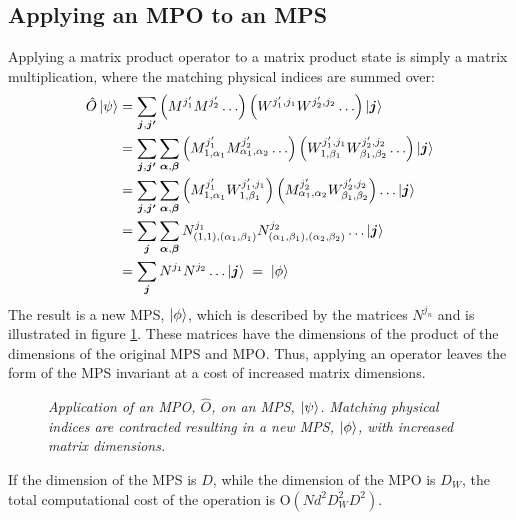 \subsection{Applying an MPO to an MPS}
Applying a matrix product operator to a matrix product state is simply a matrix multiplication, where the matching physical indices are summed over:
\begin{align}
	\hat{O} \ket{\psi} &= \sum_{\boldsymbol{j},\boldsymbol{j'}} \left( M^{ j_1 '} M^{j_2 ' } \ldots \right) \left( W^{j_1 ' , j_1} W^{j_2 ' , j_2} \ldots \right) \ket{\boldsymbol{j}} \nonumber \\
	&= \sum_{\boldsymbol{j},\boldsymbol{j'}} \sum_{\boldsymbol{\alpha},\boldsymbol{\beta}} \left( M_{1, \alpha_1}^{ j_1 '} M_{\alpha_1, \alpha_2}^{j_2 '} \ldots \right) \left( W_{1, \beta_1}^{j_1 ' , j_1 } W_{\beta_1, \beta_2}^{j_2 ', j_2 } \ldots \right) \ket{\boldsymbol{j}} \nonumber \\
&= \sum_{\boldsymbol{j},\boldsymbol{j'}} \sum_{\boldsymbol{\alpha},\boldsymbol{\beta}} \left( M_{1, \alpha_1}^{ j_1 '} W_{1, \beta_1}^{j_1 ' , j_1} \right) \left( M_{\alpha_1, \alpha_2}^{j_2 '}  W_{\beta_1, \beta_2}^{j_2 ' , j_2} \right) \ldots \ket{\boldsymbol{j}} \nonumber \\
&= \sum_{\boldsymbol{j}} \sum_{\boldsymbol{\alpha},\boldsymbol{\beta}} N_{(1,1),(\alpha_1 , \beta_1)}^{j_1} N_{(\alpha_1 , \beta_1),(\alpha_2 , \beta_2)}^{j_2} \ldots \ket{\boldsymbol{j}} \nonumber \\
&= \sum_{\boldsymbol{j}} N^{j_1} N^{j_2} \ldots \ket{\boldsymbol{j}} \; = \; \ket{\phi}
\label{eq:optBracketsMPO}
\end{align} 
The result is a new MPS, $\ket{\phi}$, which is described by the matrices $N^{j_n}$ and is illustrated in figure \ref{fig:MPOcont}. These matrices have the dimensions of the product of the dimensions of the original MPS and MPO. Thus, applying an operator leaves the form of the MPS invariant at a cost of increased matrix dimensions.
\begin{figure}[h!]
	\centering
	
	\caption{\textit{Application of an MPO, $\hat{O}$, on an MPS, $\ket{\psi}$. Matching physical indices are contracted resulting in a new MPS, $\ket{\phi}$, with increased matrix dimensions.}}
	\label{fig:MPOcont}
\end{figure}
If the dimension of the MPS is $D$, while the dimension of the MPO is $D_W$, the total computational cost of the operation is $\mathrm{O}(N d^2 D_W ^2 D^2)$.\cite{schollwock, McCulloch2007}

